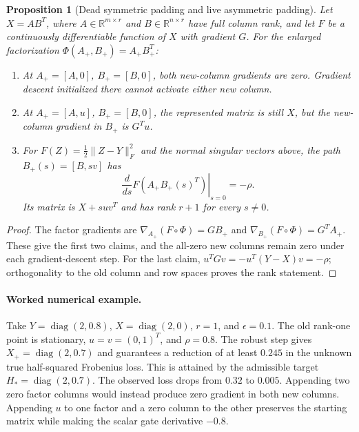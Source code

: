 \documentclass[11pt]{article}
\newtheorem{proposition}[theorem]{Proposition}
\theoremstyle{definition}
\theoremstyle{remark}
\begin{document}
\begin{proposition}[Dead symmetric padding and live asymmetric padding]
\label{ce:factor-padding}
Let $X=AB^T$, where $A\in\mathbb R^{m\times r}$ and
$B\in\mathbb R^{n\times r}$ have full column rank, and let $F$ be a
continuously differentiable function of $X$ with gradient $G$.
For the enlarged factorization
$\Phi(A_+,B_+)=A_+B_+^T$:
\begin{enumerate}
\item At $A_+=[A,0]$, $B_+=[B,0]$, both new-column gradients are zero.
      Gradient descent initialized there cannot activate either new column.
\item At $A_+=[A,u]$, $B_+=[B,0]$, the represented matrix is still $X$,
      but the new-column gradient in $B_+$ is $G^Tu$.
\item For $F(Z)=\frac12\|Z-Y\|_F^2$ and the normal singular vectors
      above, the path $B_+(s)=[B,sv]$ has
\[
 \left.\frac{d}{ds}F(A_+B_+(s)^T)\right|_{s=0}=-\rho.
\]
      Its matrix is $X+suv^T$ and has rank $r+1$ for every $s\ne0$.
\end{enumerate}
\end{proposition}
\begin{proof}
The factor gradients are $\nabla_{A_+}(F\circ\Phi)=GB_+$ and
$\nabla_{B_+}(F\circ\Phi)=G^TA_+$. These give the first two claims,
and the all-zero new columns remain zero under each gradient-descent step.
For the last claim, $u^TGv=-u^T(Y-X)v=-\rho$; orthogonality to the old
column and row spaces proves the rank statement.
\end{proof}

\paragraph{Worked numerical example.}
Take $Y=\operatorname{diag}(2,0.8)$, $X=\operatorname{diag}(2,0)$,
$r=1$, and $\epsilon=0.1$. The old rank-one point is stationary,
$u=v=(0,1)^T$, and $\rho=0.8$. The robust step gives
$X_+=\operatorname{diag}(2,0.7)$ and guarantees a reduction of at least
$0.245$ in the unknown true half-squared Frobenius loss. This is attained
by the admissible target $H_*=\operatorname{diag}(2,0.7)$.
The observed loss drops from $0.32$ to $0.005$.
Appending two zero factor columns would instead produce zero gradient in
both new columns. Appending $u$ to one factor and a zero column to the other
preserves the starting matrix while making the scalar gate derivative
$-0.8$.
\end{document}
